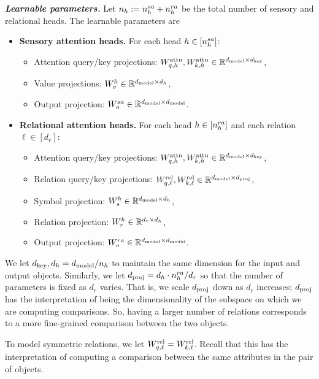 \textit{\textbf{Learnable parameters.}} Let $n_h := n_h^{sa} + n_h^{ra}$ be the total number of sensory and relational heads. The learnable parameters are
\begin{itemize}[left=5pt]
    \item \textbf{Sensory attention heads.} For each head $h \in [n_h^{sa}]$:
    \begin{itemize}[label=$\circ$]
        \item Attention query/key projections: $W_{q, h}^{\mathrm{attn}}, W_{k, h}^{\mathrm{attn}} \in \mathbb{R}^{d_{\mathrm{model}} \times d_{\mathrm{key}}}$, 
        \item Value projections: $W_v^h \in \mathbb{R}^{d_{\mathrm{model}} \times d_h}$,
        \item Output projection: $W_o^{sa} \in \mathbb{R}^{d_{\mathrm{model}} \times d_{\mathrm{model}}}$.
    \end{itemize}
    \item \textbf{Relational attention heads.} For each head $h \in [n_h^{ra}]$ and each relation $\ell \in [d_r]$:
    \begin{itemize}[label=$\circ$]
        \item Attention query/key projections: $W_{q, h}^{\mathrm{attn}}, W_{k, h}^{\mathrm{attn}} \in \mathbb{R}^{d_{\mathrm{model}} \times d_{\mathrm{key}}}$,
        \item Relation query/key projections: $W_{q, \ell}^{\mathrm{rel}}, W_{k, \ell}^{\mathrm{rel}} \in \mathbb{R}^{d_{\mathrm{model}} \times d_{\mathrm{proj}}}$,
        \item Symbol projection: $W_s^h \in \mathbb{R}^{d_{\mathrm{model}} \times d_h}$,
        \item Relation projection: $W_r^h \in \mathbb{R}^{d_r \times d_h}$,
        \item Output projection: $W_o^{ra} \in \mathbb{R}^{d_{\mathrm{model}} \times d_{\mathrm{model}}}$.
    \end{itemize}
\end{itemize}
We let $d_{\mathrm{key}}, d_h = d_{\mathrm{model}} / n_h$ to maintain the same dimension for the input and output objects. Similarly, we let $d_{\mathrm{proj}} = d_h \cdot n_h^{ra} / d_r$ so that the number of parameters is fixed as $d_r$ varies. That is, we scale $d_{\mathrm{proj}}$ down as $d_r$ increases; $d_{\mathrm{proj}}$ has the interpretation of being the dimensionality of the subspace on which we are computing comparisons. So, having a larger number of relations corresponds to a more fine-grained comparison between the two objects.

To model symmetric relations, we let $W_{q, \ell}^{\mathrm{rel}} = W_{k, \ell}^{\mathrm{rel}}$. Recall that this has the interpretation of computing a comparison between the same attributes in the pair of objects.

